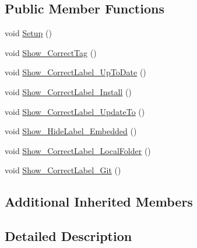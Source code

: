\subsection*{Public Member Functions}
\begin{DoxyCompactItemize}
\item 
void \mbox{\hyperlink{class_unity_editor_1_1_package_manager_1_1_u_i_1_1_tests_1_1_package_details_tests_a59e25fd7a6aab61a6aea2e0ae8964f61}{Setup}} ()
\item 
void \mbox{\hyperlink{class_unity_editor_1_1_package_manager_1_1_u_i_1_1_tests_1_1_package_details_tests_a596c8c89e303ba583b51c1dbd53ef9cd}{Show\+\_\+\+Correct\+Tag}} ()
\item 
void \mbox{\hyperlink{class_unity_editor_1_1_package_manager_1_1_u_i_1_1_tests_1_1_package_details_tests_af059d4f10a91b86b022adec6b2a8458a}{Show\+\_\+\+Correct\+Label\+\_\+\+Up\+To\+Date}} ()
\item 
void \mbox{\hyperlink{class_unity_editor_1_1_package_manager_1_1_u_i_1_1_tests_1_1_package_details_tests_a331d5bcc5b96e2c913b094756efce0b4}{Show\+\_\+\+Correct\+Label\+\_\+\+Install}} ()
\item 
void \mbox{\hyperlink{class_unity_editor_1_1_package_manager_1_1_u_i_1_1_tests_1_1_package_details_tests_a2ac632f640db1c66f02bd2b3e621c98d}{Show\+\_\+\+Correct\+Label\+\_\+\+Update\+To}} ()
\item 
void \mbox{\hyperlink{class_unity_editor_1_1_package_manager_1_1_u_i_1_1_tests_1_1_package_details_tests_afc925f444710c88e642b906ed82e0363}{Show\+\_\+\+Hide\+Label\+\_\+\+Embedded}} ()
\item 
void \mbox{\hyperlink{class_unity_editor_1_1_package_manager_1_1_u_i_1_1_tests_1_1_package_details_tests_a37997d39e800c9658e978f7a40940759}{Show\+\_\+\+Correct\+Label\+\_\+\+Local\+Folder}} ()
\item 
void \mbox{\hyperlink{class_unity_editor_1_1_package_manager_1_1_u_i_1_1_tests_1_1_package_details_tests_a61b724f3056f6ae44b9283bd546c9329}{Show\+\_\+\+Correct\+Label\+\_\+\+Git}} ()
\end{DoxyCompactItemize}
\subsection*{Additional Inherited Members}


\subsection{Detailed Description}


